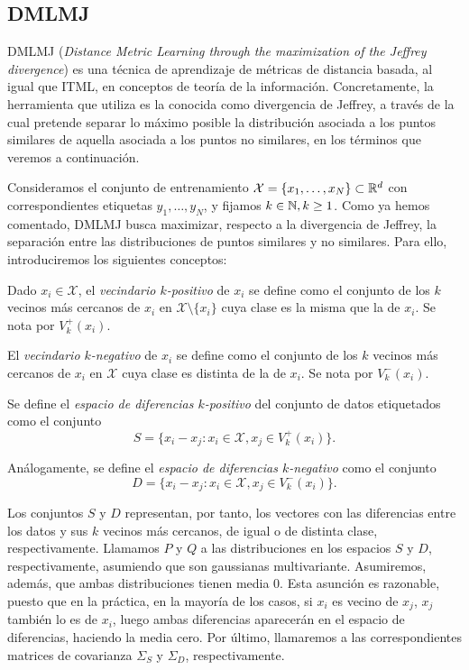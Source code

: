 \documentclass{book}
\begin{document}
\subsection{DMLMJ}

DMLMJ (\emph{Distance Metric Learning through the maximization of the Jeffrey divergence}) \cite{dmlmj} es una técnica de aprendizaje de métricas de distancia basada, al igual que ITML, en conceptos de teoría de la información. Concretamente, la herramienta que utiliza es la conocida como divergencia de Jeffrey, a través de la cual pretende separar lo máximo posible la distribución asociada a los puntos similares de aquella asociada a los puntos no similares, en los términos que veremos a continuación.

Consideramos el conjunto de entrenamiento $\mathcal{X} = \{x_1,\dots,x_N\} \subset \mathbb{R}^d$ con correspondientes etiquetas $y_1,\dots,y_N$, y fijamos $k \in \mathbb{N}, k \ge 1$. Como ya hemos comentado, DMLMJ busca maximizar, respecto a la divergencia de Jeffrey, la separación entre las distribuciones de puntos similares y no similares. Para ello, introduciremos los siguientes conceptos:

\begin{definition}
	Dado $x_i \in \mathcal{X}$, el \emph{vecindario $k$-positivo} de $x_i$ se define como el conjunto de los $k$ vecinos más cercanos de $x_i$ en $\mathcal{X} \setminus \{x_i\}$ cuya clase es la misma que la de $x_i$. Se nota por $V_k^+(x_i)$.

	El \emph{vecindario $k$-negativo} de $x_i$ se define como el conjunto de los $k$ vecinos más cercanos de $x_i$ en $\mathcal{X}$ cuya clase es distinta de la de $x_i$. Se nota por $V_k^-(x_i)$.

	Se define el \emph{espacio de diferencias $k$-positivo} del conjunto de datos etiquetados como el conjunto 
	\[ S = \{x_i - x_j \colon x_i \in \mathcal{X}, x_j \in V_k^+(x_i)\}. \]

	Análogamente, se define el \emph{espacio de diferencias $k$-negativo} como el conjunto
	\[ D = \{x_i - x_j \colon x_i \in \mathcal{X}, x_j \in V_k^-(x_i)\}. \]

\end{definition}

Los conjuntos $S$ y $D$ representan, por tanto, los vectores con las diferencias entre los datos y sus $k$ vecinos más cercanos, de igual o de distinta clase, respectivamente. Llamamos $P$ y $Q$ a las distribuciones en los espacios $S$ y $D$, respectivamente, asumiendo que son gaussianas multivariante. Asumiremos, además, que ambas distribuciones tienen media 0. Esta asunción es razonable, puesto que en la práctica, en la mayoría de los casos, si $x_i$ es vecino de $x_j$, $x_j$ también lo es de $x_i$, luego ambas diferencias aparecerán en el espacio de diferencias, haciendo la media cero. Por último, llamaremos a las correspondientes matrices de covarianza $\Sigma_S$ y $\Sigma_D$, respectivamente.
\end{document}
